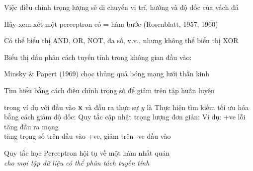 \documentclass{article}
\begin{document}
\begin{huge}
Việc điều chỉnh trọng lượng sẽ di chuyển vị trí, hướng và độ dốc của vách đá


Hãy xem xét một perceptron có  = hàm bước (Rosenblatt, 1957, 1960)


Có thể biểu thị AND, OR, NOT, đa số, v.v., nhưng không thể biểu thị XOR

Biểu thị dấu phân cách tuyến tính  trong không gian đầu vào:

\vspace*{0.1in}

\textwidth
{}

Minsky \& Papert (1969) chọc thủng quả bóng mạng lưới thần kinh



Tìm hiểu bằng cách điều chỉnh trọng số để giảm  trên tập huấn luyện

 trong ví dụ với đầu vào \(\mbox{{\bf x}}\) và
đầu ra thực sự \(y\) là 
\mat{\[
  E = \frac{1}{2}\J{Err}^2  \equiv \frac{1}{2}(y-h_{\smbf{W}}(\x))^2\ ,
\]}
Thực hiện tìm kiếm tối ưu hóa bằng cách giảm độ dốc:
Quy tắc cập nhật trọng lượng đơn giản:
Ví dụ: +ve lỗi \mat{$\implies$} tăng đầu ra mạng \\
\mat{$\implies$} tăng trọng số trên đầu vào +ve, giảm trên -ve đầu vào


Quy tắc học Perceptron hội tụ về một hàm nhất quán\\
\emph{cho mọi tập dữ liệu có thể phân tách tuyến tính }


\end{huge}
\end{document}
